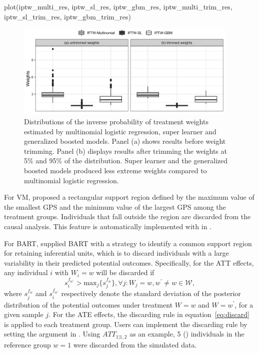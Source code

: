\begin{Schunk}
\begin{Sinput}
plot(iptw_multi_res, iptw_sl_res, iptw_gbm_res, iptw_multi_trim_res, 
     iptw_sl_trim_res, iptw_gbm_trim_res)
\end{Sinput}
\end{Schunk}

\begin{figure}[H]
\centering
\includegraphics[width = 0.95\textwidth]{p_weight_comparison.png}
\caption{Distributions of the inverse probability of treatment weights estimated by multinomial logistic regression, super learner and generalized boosted models. Panel (a) shows results before weight trimming. Panel (b) displays results after trimming the weights at 5\% and 95\% of the distribution. Super learner and the generalized boosted models produced less extreme weights compared to multinomial logistic regression.  }
\label{fig:p_est_weights}
\end{figure}




For VM,  \cite{lopez2017estimation} proposed a rectangular support region defined by the maximum value of the smallest GPS and the minimum value of the largest GPS among the treatment groups. Individuals that fall outside the region are discarded from the causal analysis. This feature is automatically implemented with  in . 

For BART, \cite{hu2020estimation} supplied BART with a strategy to identify a common support region for retaining inferential units, which is to discard individuals with a large variability in their predicted potential outcomes. Specifically, for the ATT effects, any individual $i$ with $W_i = w$ will be discarded if
\begin{equation} \label{eq:discard}
  s_i^{f_{w^\prime}} > \text{max}_j \{s_j^{f_w} \}, \forall j: W_j = w, w^\prime \neq w \in \mathscr{W},   
\end{equation}
 where $s_j^{f_w}$ and $s_i^{f_{w^\prime}}$ respectively denote the standard deviation of the posterior distribution of the potential outcomes under treatment $W = w$ and $W = w^\prime$, for a given sample $j$. For the ATE effects, the discarding rule in equation~\eqref{eq:discard} is applied to each treatment group. Users can implement the discarding rule by setting the  argument in . Using $ATT_{1|1,2}$ as an example, 5 () individuals in the reference group $w=1$ were discarded from the simulated data. 

